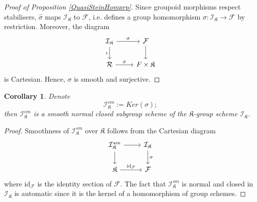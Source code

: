 \documentclass{amsart}
\newtheorem{corollary}[theorem]{Corollary}
\theoremstyle{remark}
\numberwithin{theorem}{section}
\numberwithin{equation}{section}
\begin{document}
\begin{proof}[Proof of Proposition \ref{QuasiSteinHomprp}] 
Since groupoid morphisms respect stabilisers, $\hat{\sigma}$ maps $\mathcal I_{\mathfrak{K}}$ to $\mathcal F$, i.e. defines a group homomorphism $\sigma:\mathcal I_{\mathfrak{K}} \rightarrow \mathcal F$ by restriction. Moreover, the diagram
\begin{equation}\label{QuasiSteinHomeqn}
\begin{tikzcd}
\mathcal I_{\mathfrak{K}} \arrow[r, "\sigma"] \arrow[d, "\iota"'] & \mathcal F \arrow[d]  \\
\mathcal R \arrow[r, "\hat{\sigma}"]                              & F \times \mathfrak{K}
\end{tikzcd}
\end{equation}
is Cartesian. Hence, $\sigma$ is smooth and surjective.
\end{proof}

\begin{corollary}\label{SmoothCentralisercor}
    Denote 
    \begin{equation}\label{SmoothCentraliser1qn}
        \mathcal I^{sm}_\mathfrak{K} := Ker(\sigma);
    \end{equation}
    then $\mathcal I^{sm}_{\mathfrak{K}}$ is a smooth normal closed subgroup scheme of the $\mathfrak{K}$-group scheme $\mathcal I_{\mathfrak{K}}$.
\end{corollary}

\begin{proof} 
Smoothness of $\mathcal I^{sm}_{\mathfrak{K}}$ over $\mathfrak{K}$ follows from the Cartesian diagram
\begin{equation}\label{SmoothCentraliser2eqn}
\begin{tikzcd}
\mathcal I^{sm}_\mathfrak{K} \arrow[r] \arrow[d] & \mathcal I_{\mathfrak{K}} \arrow[d, "\sigma"] \\
\mathfrak{K} \arrow[r, "\text{id}_\mathcal F"]           & \mathcal F                                   
\end{tikzcd}
\end{equation}
where $\text{id}_{\mathcal F}$ is the identity section of $\mathcal F$. The fact that $\mathcal I^{sm}_\mathfrak{K}$ is normal and closed in $\mathcal I_{\mathfrak{K}}$ is automatic since it is the kernel of a homomorphism of group schemes.
\end{proof}
\end{document}
